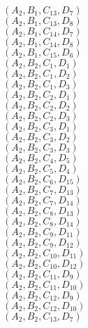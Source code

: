\documentclass[14pt]{article}
\begin{document}
    $({A}_{2}, {B}_{1}, {C}_{13}, {D}_{7}) $ \\ 
    $({A}_{2}, {B}_{1}, {C}_{13}, {D}_{8}) $ \\ 
    $({A}_{2}, {B}_{1}, {C}_{14}, {D}_{7}) $ \\ 
    $({A}_{2}, {B}_{1}, {C}_{14}, {D}_{8}) $ \\ 
    $({A}_{2}, {B}_{1}, {C}_{15}, {D}_{6}) $ \\ 
    $({A}_{2}, {B}_{2}, {C}_{1}, {D}_{1}) $ \\ 
    $({A}_{2}, {B}_{2}, {C}_{1}, {D}_{2}) $ \\ 
    $({A}_{2}, {B}_{2}, {C}_{1}, {D}_{3}) $ \\ 
    $({A}_{2}, {B}_{2}, {C}_{2}, {D}_{1}) $ \\ 
    $({A}_{2}, {B}_{2}, {C}_{2}, {D}_{2}) $ \\ 
    $({A}_{2}, {B}_{2}, {C}_{2}, {D}_{3}) $ \\ 
    $({A}_{2}, {B}_{2}, {C}_{3}, {D}_{1}) $ \\ 
    $({A}_{2}, {B}_{2}, {C}_{3}, {D}_{2}) $ \\ 
    $({A}_{2}, {B}_{2}, {C}_{3}, {D}_{3}) $ \\ 
    $({A}_{2}, {B}_{2}, {C}_{4}, {D}_{5}) $ \\ 
    $({A}_{2}, {B}_{2}, {C}_{5}, {D}_{4}) $ \\ 
    $({A}_{2}, {B}_{2}, {C}_{6}, {D}_{15}) $ \\ 
    $({A}_{2}, {B}_{2}, {C}_{7}, {D}_{13}) $ \\ 
    $({A}_{2}, {B}_{2}, {C}_{7}, {D}_{14}) $ \\ 
    $({A}_{2}, {B}_{2}, {C}_{8}, {D}_{13}) $ \\ 
    $({A}_{2}, {B}_{2}, {C}_{8}, {D}_{14}) $ \\ 
    $({A}_{2}, {B}_{2}, {C}_{9}, {D}_{11}) $ \\ 
    $({A}_{2}, {B}_{2}, {C}_{9}, {D}_{12}) $ \\ 
    $({A}_{2}, {B}_{2}, {C}_{10}, {D}_{11}) $ \\ 
    $({A}_{2}, {B}_{2}, {C}_{10}, {D}_{12}) $ \\ 
    $({A}_{2}, {B}_{2}, {C}_{11}, {D}_{9}) $ \\ 
    $({A}_{2}, {B}_{2}, {C}_{11}, {D}_{10}) $ \\ 
    $({A}_{2}, {B}_{2}, {C}_{12}, {D}_{9}) $ \\ 
    $({A}_{2}, {B}_{2}, {C}_{12}, {D}_{10}) $ \\ 
    $({A}_{2}, {B}_{2}, {C}_{13}, {D}_{7}) $ \\ 
\end{document}
